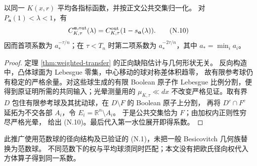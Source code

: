 \begin{corollary}[共同中心多集合的几何传递]
以同一 $K(x,r)$ 平均各指标函数，并按正文公共交集归一化。
对 $P_{\boldsymbol a}(1)<\lambda<1$，有
\[C^{\boldsymbol a,\rm out}_{K,\tau}(\lambda)
=C^{\rm out}_{K,\tau}(1-s_{\boldsymbol a}(\lambda)).\tag{N.10}\]
因而首项系数为 $a_*^{-\tau/n}$；在 $\tau<T_n$ 时第二项系数为
$a_*^{-2\tau/n}$，其中 $a_*=\min_i a_i$。
\end{corollary}
\begin{proof}
定理 \ref{thm:weighted-transfer} 的正向缺陷估计与几何形状无关。
反向构造中，凸体球面为 Lebesgue 零集，中心移动的球对称差体积趋零，
故有限参考球仍有稳定的严格余量。对这些球生成的有限 Boolean 原子作
Lebesgue 比例分割，便得到原证明所需的共同输入；光晕测量用的
$\mu_{K,\tau}\ll dx$ 不改变严格见证。取有界 $D$ 包住有限参考球及其扰动球，在 $D\setminus F$ 的 Boolean 原子上分割，
再将 $D^c\cap F^c$ 延拓为不交各部 $A_i$，令 $E_i=\mathbb R^n\setminus A_i$。
于是公共交集恰为 $F$；由加权内正则性穷尽严格光晕，
给出 (N.10)。最后代入第一水位展开即得系数。
\end{proof}
此推广使用范数球的径向结构及已验证的 (N.1)，未把一般 Besicovitch 几何族替换为范数球。
不同范数下的权与平均球须同时匹配；本文没有把欧氏径向权代入方体算子得到同一系数。
